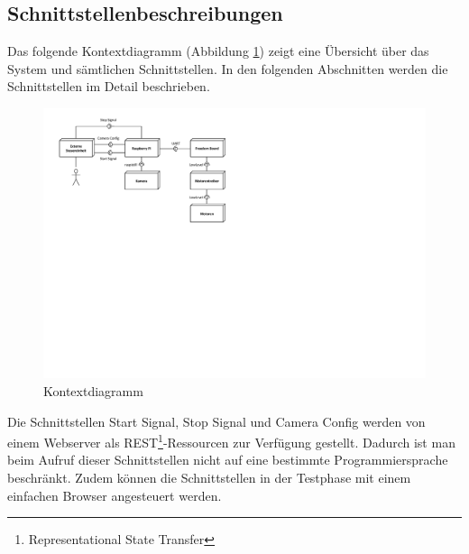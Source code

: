 \subsection{Schnittstellenbeschreibungen}
Das folgende Kontextdiagramm (Abbildung \ref{fig:kontextdiagramm}) zeigt eine Übersicht über das System und sämtlichen Schnittstellen. In den folgenden Abschnitten werden die Schnittstellen im Detail beschrieben.

\begin{figure}[h!]
	\centering
	\includegraphics[width=0.9\linewidth]{../../fig/kontextdiagramm}
	\caption{Kontextdiagramm}
	\label{fig:kontextdiagramm}
\end{figure}

Die Schnittstellen Start Signal, Stop Signal und Camera Config werden von einem Webserver als REST\footnote{Representational State Transfer}-Ressourcen zur Verfügung gestellt. Dadurch ist man beim Aufruf dieser Schnittstellen nicht auf eine bestimmte Programmiersprache beschränkt. Zudem können die Schnittstellen in der Testphase mit einem einfachen Browser angesteuert werden.





\newpage



\newpage







